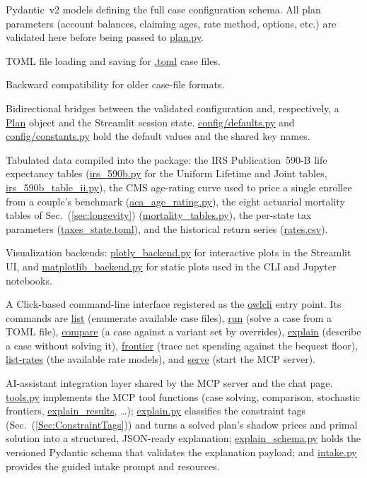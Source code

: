 \documentclass[fleqn,12pt]{report}
\newcommand{\code}[1]{\url{#1}}
\begin{document}
\begin{sloppypar}
\begin{description}[style=nextline, leftmargin=2.5cm, font=\ttfamily]
\item[config/schema.py]
Pydantic~v2 models defining the full case configuration schema.
All plan parameters (account balances, claiming ages, rate method, options,
etc.) are validated here before being passed to \code{plan.py}.

\item[config/toml\_io.py]
TOML file loading and saving for \code{.toml} case files.

\item[config/legacy.py]
Backward compatibility for older case-file formats.

\item[config/plan\_bridge.py, config/ui\_bridge.py]
Bidirectional bridges between the validated configuration and, respectively, a
\code{Plan} object and the Streamlit session state.
\code{config/defaults.py} and \code{config/constants.py} hold the default values
and the shared key names.

\item[data/]
Tabulated data compiled into the package: the IRS Publication~590-B life
expectancy tables (\code{irs_590b.py} for the Uniform Lifetime and Joint tables,
\code{irs_590b_table_ii.py}), the CMS age-rating curve used to price a single
enrollee from a couple's benchmark (\code{aca_age_rating.py}), the eight
actuarial mortality tables of Sec.~(\ref{sec:longevity})
(\code{mortality_tables.py}), the per-state tax parameters
(\code{taxes_state.toml}), and the historical return series
(\code{rates.csv}).

\item[plotting/]
Visualization backends: \code{plotly_backend.py} for interactive plots
in the Streamlit UI, and \code{matplotlib_backend.py} for static plots
used in the CLI and Jupyter notebooks.

\item[cli/]
A Click-based command-line interface registered as the \code{owlcli}
entry point.
Its commands are \code{list} (enumerate available case files), \code{run}
(solve a case from a TOML file), \code{compare} (a case against a variant set by
overrides), \code{explain} (describe a case without solving it), \code{frontier}
(trace net spending against the bequest floor), \code{list-rates} (the available
rate models), and \code{serve} (start the MCP server).

\item[assistant/]
AI-assistant integration layer shared by the MCP server and the chat page.
\code{tools.py} implements the MCP tool functions (case solving, comparison,
stochastic frontiers, \code{explain_results}, \ldots);
\code{explain.py} classifies the constraint tags
(Sec.~(\ref{Sec:ConstraintTags})) and turns a solved plan's shadow prices and
primal solution into a structured, JSON-ready explanation;
\code{explain_schema.py} holds the versioned Pydantic schema that validates the
explanation payload; and \code{intake.py} provides the guided intake prompt and
resources.

\end{description}
\end{sloppypar}
\end{document}
